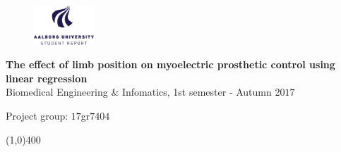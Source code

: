 \clearpage
\thispagestyle{empty}

\begin{figure}[H]
	\raggedleft
	\includegraphics[width=0.2\textwidth]{figures/aaulogo-en.png}
\end{figure} 

\vspace{5 cm}

\begin{center}
	\begin{Huge}
		\textbf{The effect of limb position on myoelectric prosthetic control using linear regression}\\
		\vspace{5 mm}
		Biomedical Engineering \& Infomatics, 1st semester - Autumn $2017$\\
		\vspace{3 mm}
	\end{Huge}
	{\Large Project group: $17$gr$7404$}
\end{center}
\vspace*{\fill}

\begin{center}
	\line(1,0){400}
\end{center}

